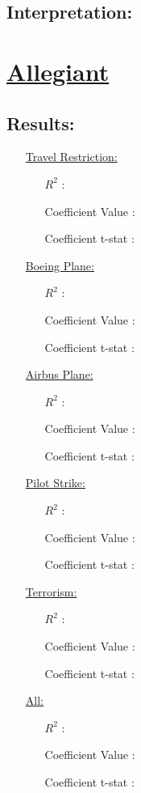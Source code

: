 \documentclass[12pt]{report}
\begin{document}
\subsection*{Interpretation:}

\newpage
\section*{\underline{Allegiant}}
\subsection*{Results:}
\begin{enumerate}
    \item[\underline{Travel Restriction:}]
        \begin{enumerate}
            \item[$R^2$]:
            \item[Coefficient Value]:
            \item[Coefficient t-stat]:
        \end{enumerate}
    \item[\underline{Boeing Plane:}]
        \begin{enumerate}
            \item[$R^2$]:
            \item[Coefficient Value]:
            \item[Coefficient t-stat]:
        \end{enumerate}
    \item[\underline{Airbus Plane:}]
        \begin{enumerate}
            \item[$R^2$]:
            \item[Coefficient Value]:
            \item[Coefficient t-stat]:
        \end{enumerate}
    \item[\underline{Pilot Strike:}]
        \begin{enumerate}
            \item[$R^2$]:
            \item[Coefficient Value]:
            \item[Coefficient t-stat]:
        \end{enumerate}
    \item[\underline{Terrorism:}]\\
        \begin{enumerate}
            \item[$R^2$]:
            \item[Coefficient Value]:
            \item[Coefficient t-stat]:
        \end{enumerate}
    \item[\underline{All:}]
        \begin{enumerate}
            \item[$R^2$]:
            \item[Coefficient Value]:
            \item[Coefficient t-stat]:
        \end{enumerate}
\end{enumerate}
\end{document}
